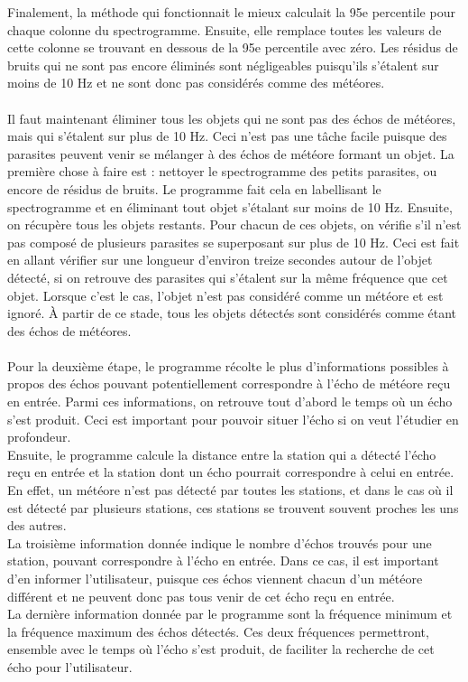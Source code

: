 \documentclass[11pt]{article}
\begin{document}
Finalement, la méthode qui fonctionnait le mieux calculait la 95e percentile pour chaque colonne du spectrogramme.
Ensuite, elle remplace toutes les valeurs de cette colonne se trouvant en dessous de la 95e percentile avec zéro.
Les résidus de bruits qui ne sont pas encore éliminés sont négligeables puisqu'ils s'étalent sur moins de 10 Hz et ne sont donc pas considérés comme des météores.\\
\\
Il faut maintenant éliminer tous les objets qui ne sont pas des échos de météores, mais qui s'étalent sur plus de 10 Hz.
Ceci n'est pas une tâche facile puisque des parasites peuvent venir se mélanger à des échos de météore formant un objet.
La première chose à faire est : nettoyer le spectrogramme des petits parasites, ou encore de résidus de bruits.
Le programme fait cela en labellisant le spectrogramme et en éliminant tout objet s'étalant sur moins de 10 Hz.
Ensuite, on récupère tous les objets restants.
Pour chacun de ces objets, on vérifie s'il n'est pas composé de plusieurs parasites se superposant sur plus de 10 Hz.
Ceci est fait en allant vérifier sur une longueur d'environ treize secondes autour de l'objet détecté, si on retrouve des parasites qui s'étalent sur la même fréquence que cet objet.
Lorsque c'est le cas, l'objet n'est pas considéré comme un météore et est ignoré.
À partir de ce stade, tous les objets détectés sont considérés comme étant des échos de météores.\\
\\
Pour la deuxième étape, le programme récolte le plus d'informations possibles à propos des échos pouvant potentiellement correspondre à l'écho de météore reçu en entrée.
Parmi ces informations, on retrouve tout d'abord le temps où un écho s'est produit.
Ceci est important pour pouvoir situer l'écho si on veut l'étudier en profondeur.\\
Ensuite, le programme calcule la distance entre la station qui a détecté l'écho reçu en entrée et la station dont un écho pourrait correspondre à celui en entrée.
En effet, un météore n'est pas détecté par toutes les stations, et dans le cas où il est détecté par plusieurs stations, ces stations se trouvent souvent proches les uns des autres.\\
La troisième information donnée indique le nombre d'échos trouvés pour une station, pouvant correspondre à l'écho en entrée.
Dans ce cas, il est important d'en informer l'utilisateur, puisque ces échos viennent chacun d'un météore différent et ne peuvent donc pas tous venir de cet écho reçu en entrée.\\
La dernière information donnée par le programme sont la fréquence minimum et la fréquence maximum des échos détectés.
Ces deux fréquences permettront, ensemble avec le temps où l'écho s'est produit, de faciliter la recherche de cet écho pour l'utilisateur.
\end{document}
